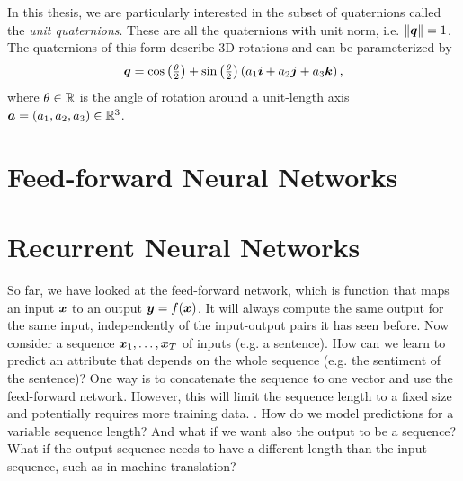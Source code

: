		In this thesis, we are particularly interested in the subset of quaternions called the \emph{unit quaternions}. These are all the quaternions with unit norm, i.e. $\lVert \bm{q} \rVert = 1$. 
		The quaternions of this form describe 3D rotations and can be parameterized by
		\begin{equation}
			\bm{q} = 
			\cos\left(\tfrac{\theta}{2}\right) + 
			\sin\left(\tfrac{\theta}{2}\right) \left(a_1 \bm{i} + a_2 \bm{j} + a_3 \bm{k}\right),
		\end{equation}
		where $\theta \in \mathbb{R}$ is the angle of rotation around a unit-length axis $\bm{a} = (a_1, a_2, a_3) \in \mathbb{R}^3$.
	
	\section{Feed-forward Neural Networks}
	
	\section{Recurrent Neural Networks}
		\newcommand{\imagecourtesycolah}{Image courtesy Christopher Olah \mbox{\href{http://colah.github.io/}{(colah.github.io)}}}
		So far, we have looked at the feed-forward network, which is function that maps an input $\bm{x}$ to an output $\bm{y} = f(\bm{x})$.
		It will always compute the same output for the same input, independently of the input-output pairs it has seen before.
		Now consider a sequence $\bm{x}_1, \dots, \bm{x}_T$ of inputs (e.g. a sentence).
		How can we learn to predict an attribute that depends on the whole sequence (e.g. the sentiment of the sentence)?
		One way is to concatenate the sequence to one vector and use the feed-forward network.
		However, this will limit the sequence length to a fixed size and potentially requires more training data.
		.
		How do we model predictions for a variable sequence length?
		And what if we want also the output to be a sequence? 
		What if the output sequence needs to have a different length than the input sequence, such as in machine translation? 
		
